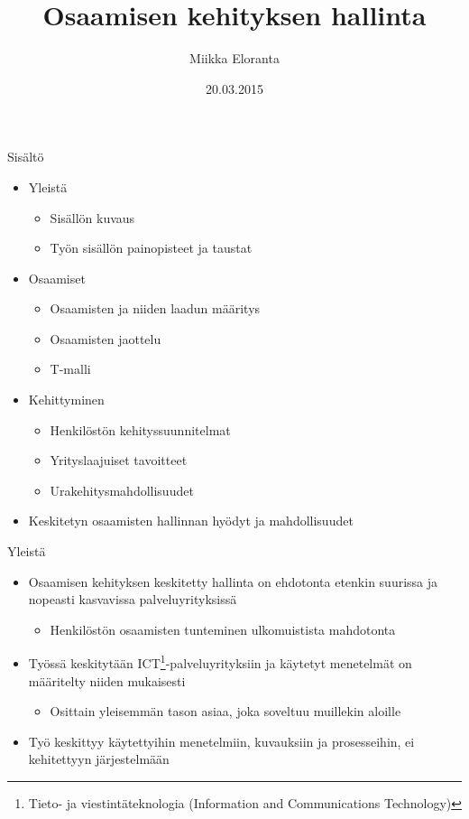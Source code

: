 \documentclass[first=purple,second=dblue,logo=redquo]{aaltoslides}
\title{Osaamisen kehityksen hallinta}
\author[M. Eloranta]{Miikka Eloranta}
\institute[AS]{Automaatio- ja systeemitekniikka\\
Sähkötekniikan korkeakoulu, Aalto-yliopisto}
\date{20.03.2015}
\begin{document}
\aaltotitleframe

\begin{frame}{Sisältö}
\begin{itemize}
\item Yleistä
\begin{itemize}
\item Sisällön kuvaus
\item Työn sisällön painopisteet ja taustat
\end{itemize}
\item Osaamiset
\begin{itemize}
\item Osaamisten ja niiden laadun määritys
\item Osaamisten jaottelu
\item T-malli
\end{itemize}
\item Kehittyminen
\begin{itemize}
\item Henkilöstön kehityssuunnitelmat
\item Yrityslaajuiset tavoitteet
\item Urakehitysmahdollisuudet
\end{itemize}
\item Keskitetyn osaamisten hallinnan hyödyt ja mahdollisuudet
\end{itemize}
\end{frame}

\begin{frame}{Yleistä}
\begin{itemize}
\item Osaamisen kehityksen keskitetty hallinta on ehdotonta etenkin suurissa ja nopeasti kasvavissa palveluyrityksissä
\begin{itemize}
\item Henkilöstön osaamisten tunteminen ulkomuistista mahdotonta
\end{itemize}
\item Työssä keskitytään ICT\footnote{\tiny{Tieto- ja viestintäteknologia (Information and Communications Technology)}}-palveluyrityksiin ja käytetyt menetelmät on määritelty niiden mukaisesti
\begin{itemize}
\item Osittain yleisemmän tason asiaa, joka soveltuu muillekin aloille
\end{itemize}
\item Työ keskittyy käytettyihin menetelmiin, kuvauksiin ja prosesseihin, ei kehitettyyn järjestelmään
\end{itemize}
\end{frame}
\end{document}

